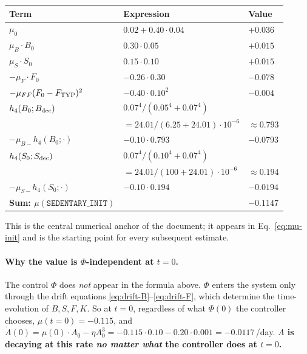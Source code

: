 \documentclass[11pt,a4paper]{article}
\theoremstyle{definition}
\begin{document}
\begin{center}\small
\begin{tabular}{lll}
\toprule
Term & Expression & Value \\
\midrule
$\mu_0$                    & $0.02 + 0.40 \cdot 0.04$        & $+0.036$ \\
$\mu_B \cdot B_0$          & $0.30 \cdot 0.05$               & $+0.015$ \\
$\mu_S \cdot S_0$          & $0.15 \cdot 0.10$               & $+0.015$ \\
$-\mu_F \cdot F_0$         & $-0.26 \cdot 0.30$              & $-0.078$ \\
$-\mu_{FF} (F_0 - F_{\rm TYP})^2$ & $-0.40 \cdot 0.10^2$     & $-0.004$ \\
$h_4(B_0; B_{\rm dec})$    & $0.07^4 / (0.05^4 + 0.07^4)$    & \\
                            & $= 24.01 / (6.25 + 24.01) \cdot 10^{-6}$ & $\approx 0.793$ \\
$-\mu_{B-} h_4(B_0; \cdot)$ & $-0.10 \cdot 0.793$             & $-0.0793$ \\
$h_4(S_0; S_{\rm dec})$    & $0.07^4 / (0.10^4 + 0.07^4)$    & \\
                            & $= 24.01 / (100 + 24.01) \cdot 10^{-6}$ & $\approx 0.194$ \\
$-\mu_{S-} h_4(S_0; \cdot)$ & $-0.10 \cdot 0.194$             & $-0.0194$ \\
\midrule
\textbf{Sum: $\mu(\texttt{SEDENTARY\_INIT})$} & & $\boldsymbol{-0.1147}$ \\
\bottomrule
\end{tabular}
\end{center}

This is the central numerical anchor of the document; it appears in Eq.~\eqref{eq:mu-init} and is the starting point for every subsequent estimate.

\paragraph{Why the value is $\Phi$-independent at $t=0$.} The control $\Phi$ does \emph{not} appear in the formula above. $\Phi$ enters the system only through the drift equations \eqref{eq:drift-B}--\eqref{eq:drift-F}, which determine the time-evolution of $B, S, F, K$. So at $t = 0$, regardless of what $\Phi(0)$ the controller chooses, $\mu(t=0) = -0.115$, and $\dot A(0) = \mu(0) \cdot A_0 - \eta A_0^3 = -0.115 \cdot 0.10 - 0.20 \cdot 0.001 = -0.0117$\,/day. \textbf{$A$ is decaying at this rate \emph{no matter what} the controller does at $t = 0$.}
\end{document}
